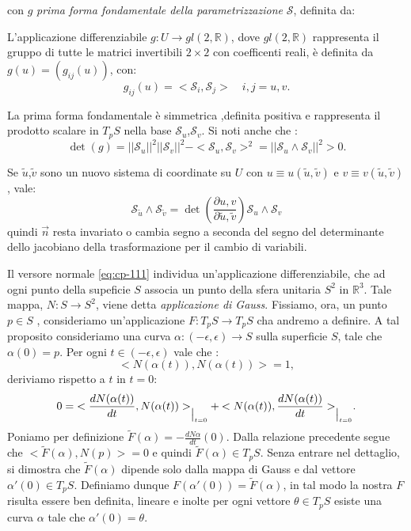 con $g$ \emph{prima forma fondamentale della parametrizzazione} $\mathcal{S}$, definita da:
\begin{definizione}
L'applicazione differenziabile $g:U\longrightarrow gl(2,\mathbb{R})$, dove $gl(2,\mathbb{R})$ rappresenta il gruppo di tutte le matrici invertibili $2\times2$ con coefficenti reali,  è definita da $g(u)=(g_{ij}(u))$, con:
\begin{equation}
\label{eq:cp-112}
g_{ij}(u) = <\mathcal{S}_i,\mathcal{S}_j>\quad i,j=u,v.
\end{equation}
\end{definizione}
\begin{osservazione}
La prima forma fondamentale è simmetrica ,definita positiva e rappresenta il prodotto scalare in $T_pS$ nella base $\mathcal{S}_u$,$\mathcal{S}_v$. 
Si noti anche che :
\[
\det(g) = ||\mathcal{S}_u||^2||\mathcal{S}_v||^2-<\mathcal{S}_u,\mathcal{S}_v>^2 = ||\mathcal{S}_u\wedge\mathcal{S}_v||^2> 0.
\]
\end{osservazione}

\begin{osservazione}
Se $\tilde{u}$,$\tilde{v}$ sono un nuovo sistema di coordinate su $U$ con $u\equiv u(\tilde{u},\tilde{v})$ e $v\equiv v(\tilde{u},\tilde{v})$, vale:
\[
\mathcal{S}_{\tilde{u}}\wedge\mathcal{S}_{\tilde{v}}=\det(\frac{\partial u,v}{\partial \tilde{u},\tilde{v}})\mathcal{S}_u\wedge\mathcal{S}_v
\]
quindi $\vec{n}$ resta invariato o cambia segno a seconda del segno del determinante dello jacobiano della trasformazione per il cambio di variabili.
\end{osservazione}
Il versore normale \eqref{eq:cp-111} individua un'applicazione differenziabile, che ad ogni punto della supeficie $S$ associa un punto della sfera unitaria $S^2$ in $\mathbb{R}^3$. Tale mappa, $N: S\longrightarrow S^2$, viene detta \emph{applicazione di Gauss}. Fissiamo, ora, un punto $p\in S$ , consideriamo un'applicazione  $F: T_pS\longrightarrow T_pS$ cha andremo a definire. A tal proposito consideriamo una curva  $\alpha : (-\epsilon,\epsilon)\longrightarrow S$ sulla superficie $S$, tale che $\alpha(0)=p$. Per ogni $t\in (-\epsilon,\epsilon)$ vale che :
\[
<N(\alpha(t)),N(\alpha(t))> = 1,
\] 
deriviamo rispetto a $t$ in $t=0$:
\[
0 = {<\frac{dN(\alpha(t))}{dt},N(\alpha(t))>}_{\big{|}_{t=0}}+{<N(\alpha(t)),\frac{dN(\alpha(t))}{dt}>}_{\big{|}_{t=0}}.
\]
Poniamo per definizione $\tilde{F}(\alpha) = -\frac{dN\alpha}{dt}(0)$. Dalla relazione precedente segue che $<\tilde{F}(\alpha),N(p)> = 0$ e quindi $\tilde{F}(\alpha)\in T_pS$. Senza entrare nel dettaglio, si dimostra che $\tilde{F}(\alpha)$ dipende solo dalla mappa di Gauss e dal vettore $\alpha'(0)\in T_pS$. Definiamo dunque $F(\alpha'(0))=\tilde{F}(\alpha)$, in tal modo la nostra $F$ risulta essere ben definita, lineare e inolte per ogni vettore $\theta\in T_pS$ esiste una curva $\alpha$ tale che $\alpha'(0)=\theta$.

